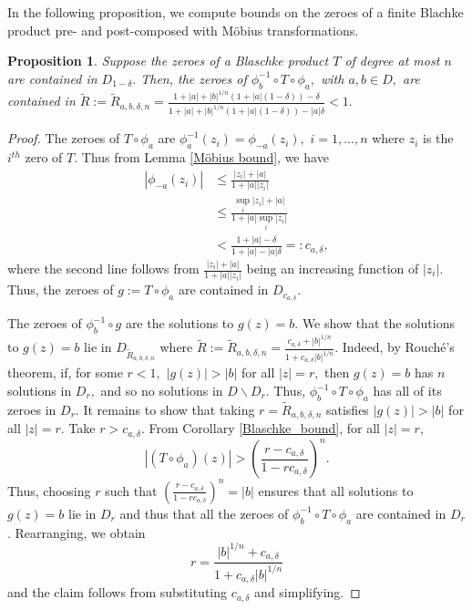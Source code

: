 \documentclass[12pt,reqno]{amsart}
\numberwithin{theorem}{section}
\newtheorem{proposition}[theorem]{Proposition}%
\begin{document}
In the following proposition, we compute bounds on the zeroes of a finite Blachke product pre- and post-composed with Möbius transformations.
\begin{proposition}\label{zero_bound}
     Suppose the zeroes of a Blaschke product $T$ of degree at most $n$ are contained in $D_{1-\delta}.$ Then, the zeroes of $\phi_{b}^{-1}\circ T\circ\phi_{a},$ with $a,b\in D,$  are contained in $\tilde{R}:=\tilde{R}_{a,b,\delta,n}=\frac{1+|a|+|b|^{1/n}(1+|a|(1-\delta))-\delta}{1+|a|+|b|^{1/n}(1+|a|(1-\delta))-|a|\delta}<1.$
\end{proposition}
\begin{proof}
    
    The zeroes of $T\circ\phi_{a}$ are $\phi_{a}^{-1}(z_{i})=\phi_{-a}(z_{i}),$ $i=1,...,n$ where $z_{i}$ is the $i^{th}$ zero of $T.$ Thus from Lemma \ref{Möbius bound}, we have \begin{align*}
        |\phi_{-a}(z_i)|&\le\frac{|z_{i}|+|a|}{1+|a||z_i|}\\&\le\frac{\sup_i|z_i|+|a|}{1+|a|\sup_i|z_i|}\\&<\frac{1+|a|-\delta}{1+|a|-|a|\delta}=:c_{a,\delta},
    \end{align*} where the second line follows from $\frac{|z_{i}|+|a|}{1+|a||z_i|}$ being an increasing function of $|z_i|.$ Thus, the zeroes of $g:=T\circ\phi_a$ are contained in $D_{c_{a,\delta}}.$ 

    The zeroes of $\phi_{b}^{-1}\circ g$ are the solutions to $g(z)=b.$ We show that the solutions to $g(z)=b$ lie in $D_{\tilde{R}_{a,b,\delta,n}}$ where $\tilde{R}:=\tilde{R}_{a,b,\delta, n}=\frac{c_{a,\delta}+|b|^{1/n}}{1+c_{a,\delta}|b|^{1/n}}.$ Indeed, by Rouché's theorem, if, for some $r<1,$ $|g(z)|>|b|$ for all $|z|=r,$ then $g(z)=b$ has $n$ solutions in $D_{r},$ and so no solutions in $D\backslash D_{r}.$ Thus, $\phi_b^{-1}\circ T\circ\phi_a$ has all of its zeroes in $D_r.$ It remains to show that taking $r=\tilde{R}_{a,b,\delta, n}$ satisfies $|g(z)|>|b|$ for all $|z|=r.$ Take $r>c_{a,\delta}.$ From Corollary \ref{Blaschke_bound}, for all $|z|=r,$ $$|(T\circ\phi_a)(z)|>\left(\frac{r-c_{a,\delta}}{1-rc_{a,\delta}}\right)^n.$$ Thus, choosing $r$ such that $\left(\frac{r-c_{a,\delta}}{1-rc_{a,\delta}}\right)^n=|b|$ ensures that all solutions to $g(z)=b$ lie in $D_r$ and thus that all the zeroes of $\phi_{b}^{-1}\circ T\circ\phi_{a}$ are contained in $D_r$. Rearranging, we obtain $$r=\frac{|b|^{1/n}+c_{a,\delta}}{1+c_{a,\delta}|b|^{1/n}}$$ and the claim follows from substituting $c_{a,\delta}$ and simplifying.
\end{proof}
\end{document}
